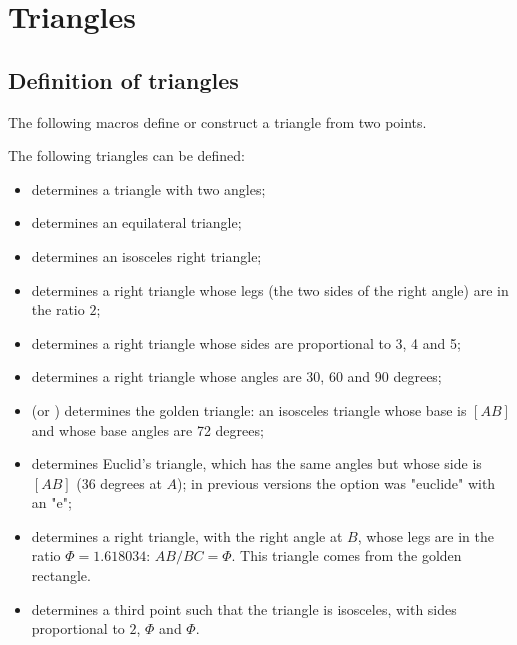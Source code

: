 \section{Triangles}

\subsection{Definition of triangles }
The following macros define or construct a triangle from  two points.

 The following triangles can be defined:
 \begin{itemize}
\item  {}  determines a triangle with two angles;
\item  {}  determines an equilateral triangle;
\item  {}  determines an isosceles right triangle;
\item {} determines a right triangle whose legs (the two sides of the right angle) are in the ratio $2$;
\item {} determines a right triangle whose sides are proportional to 3, 4 and 5;
\item {} determines a right triangle whose angles are 30, 60 and 90 degrees;
\item {} (or ) determines the golden triangle: an isosceles triangle whose base is $[AB]$ and whose base angles are 72 degrees;

\item {} determines Euclid's triangle, which has the same angles but whose side is $[AB]$ (36 degrees at $A$); in previous versions the option was "euclide" with an "e";

\item {} determines a right triangle, with the right angle at $B$, whose legs are in the ratio $\Phi=1.618034$: $AB/BC=\Phi$. This triangle comes from the golden rectangle.

\item {} determines a third point such that the triangle is isosceles, with sides proportional to $2$, $\Phi$ and $\Phi$.
\end{itemize}

